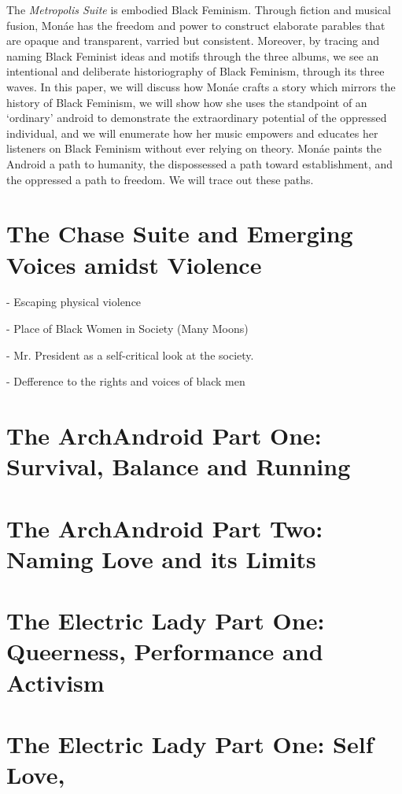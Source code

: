 \documentclass[11pt]{amsart}
\begin{document}
The \emph{Metropolis Suite} is embodied Black Feminism.
Through fiction and musical fusion, Mon\'ae has the freedom and power to construct elaborate parables that are opaque and transparent, varried but consistent.
Moreover, by tracing and naming Black Feminist ideas and motifs through the three albums, we see an intentional and deliberate historiography of Black Feminism, through its three waves.
In this paper, we will discuss how Mon\'ae crafts a story which mirrors the history of Black Feminism, we will show how she uses the standpoint of an `ordinary' android to demonstrate the extraordinary potential of the oppressed individual, and we will enumerate how her music empowers and educates her listeners on Black Feminism without ever relying on theory.
Mon\'ae paints the Android a path to humanity, the dispossessed a path toward establishment, and the oppressed a path to freedom.
We will trace out these paths. 

\section{The Chase Suite and Emerging Voices amidst Violence}
- Escaping physical violence

- Place of Black Women in Society (Many Moons)

- Mr. President as a self-critical look at the society.

- Defference to the rights and voices of black men 

\section{The ArchAndroid Part One: Survival, Balance and Running}



\section{The ArchAndroid Part Two: Naming Love and its Limits}


\section{The Electric Lady Part One: Queerness, Performance and Activism}


\section{The Electric Lady Part One: Self Love,  }
\end{document}
